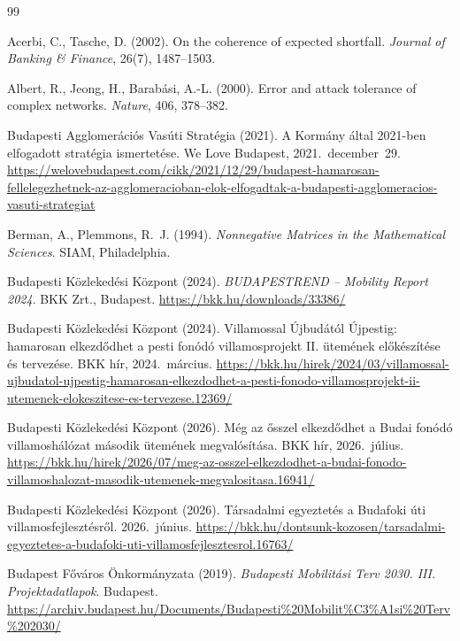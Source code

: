 \documentclass[12pt,a4paper]{article}
\theoremstyle{definition}
\theoremstyle{remark}
\begin{document}
\renewcommand{\refname}{Hivatkozások}
\begin{thebibliography}{99}
\setlength{\itemsep}{2pt}
\small

Acerbi, C., Tasche, D. (2002). On the coherence of expected shortfall.
\emph{Journal of Banking \& Finance}, 26(7), 1487--1503.

Albert, R., Jeong, H., Barabási, A.-L. (2000). Error and attack tolerance of
complex networks. \emph{Nature}, 406, 378--382.

Budapesti Agglomerációs Vasúti Stratégia (2021). A Kormány által 2021-ben
elfogadott stratégia ismertetése. We Love Budapest, 2021.~december~29.
\url{https://welovebudapest.com/cikk/2021/12/29/budapest-hamarosan-fellelegezhetnek-az-agglomeracioban-elok-elfogadtak-a-budapesti-agglomeracios-vasuti-strategiat}

Berman, A., Plemmons, R.~J. (1994). \emph{Nonnegative Matrices in the
Mathematical Sciences}. SIAM, Philadelphia.

Budapesti Közlekedési Központ (2024). \emph{BUDAPESTREND -- Mobility Report
2024}. BKK Zrt., Budapest. \url{https://bkk.hu/downloads/33386/}

Budapesti Közlekedési Központ (2024). Villamossal Újbudától Újpestig:
hamarosan elkezdődhet a pesti fonódó villamosprojekt II. ütemének előkészítése
és tervezése. BKK hír, 2024.~március.
\url{https://bkk.hu/hirek/2024/03/villamossal-ujbudatol-ujpestig-hamarosan-elkezdodhet-a-pesti-fonodo-villamosprojekt-ii-utemenek-elokeszitese-es-tervezese.12369/}

Budapesti Közlekedési Központ (2026). Még az ősszel elkezdődhet a Budai fonódó
villamoshálózat második ütemének megvalósítása. BKK hír, 2026.~július.
\url{https://bkk.hu/hirek/2026/07/meg-az-osszel-elkezdodhet-a-budai-fonodo-villamoshalozat-masodik-utemenek-megvalositasa.16941/}

Budapesti Közlekedési Központ (2026). Társadalmi egyeztetés a Budafoki úti
villamosfejlesztésről. 2026.~június.
\url{https://bkk.hu/dontsunk-kozosen/tarsadalmi-egyeztetes-a-budafoki-uti-villamosfejlesztesrol.16763/}

Budapest Főváros Önkormányzata (2019). \emph{Budapesti Mobilitási Terv 2030.
III. Projektadatlapok}. Budapest.
\url{https://archiv.budapest.hu/Documents/Budapesti%20Mobilit%C3%A1si%20Terv%202030/}


\end{thebibliography}
\end{document}
